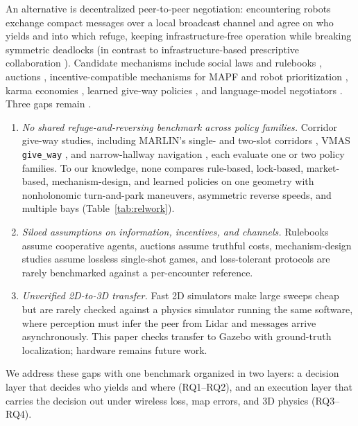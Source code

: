 An alternative is decentralized peer-to-peer negotiation: encountering robots exchange compact messages over a local broadcast channel and agree on who yields and into which refuge, keeping infrastructure-free operation while breaking symmetric deadlocks (in contrast to infrastructure-based prescriptive collaboration \cite{george2025infrastructure}). Candidate mechanisms include social laws and rulebooks \cite{kato1992coordinating,shoham1995social,censi2019rulebooks}, auctions \cite{gerkey2002sold,gautier2022negotiated}, incentive-compatible mechanisms for MAPF and robot prioritization \cite{amir2015mapfauction,das2021omcorp,friedrich2024scalable}, karma economies \cite{censi2019karma,elokda2024karma}, learned give-way policies \cite{bettini2022vmas,bettini2023heterogeneous,park2023hallucination}, and language-model negotiators \cite{marlin2024,gamechat2025,garg2024llm}. Three gaps remain \cite{chandra2026social,francis2025principles}.
\begin{enumerate}
\item \emph{No shared refuge-and-reversing benchmark across policy families.} Corridor give-way studies, including MARLIN's single- and two-slot corridors \cite{marlin2024}, VMAS \texttt{give\_way} \cite{vmasgiveway}, and narrow-hallway navigation \cite{park2023hallucination,alghamdi2025opinion}, each evaluate one or two policy families. To our knowledge, none compares rule-based, lock-based, market-based, mechanism-design, and learned policies on one geometry with nonholonomic turn-and-park maneuvers, asymmetric reverse speeds, and multiple bays (Table~\ref{tab:relwork}).
\item \emph{Siloed assumptions on information, incentives, and channels.} Rulebooks assume cooperative agents, auctions assume truthful costs, mechanism-design studies assume lossless single-shot games, and loss-tolerant protocols are rarely benchmarked against a per-encounter reference.
\item \emph{Unverified 2D-to-3D transfer.} Fast 2D simulators make large sweeps cheap but are rarely checked against a physics simulator running the same software, where perception must infer the peer from Lidar and messages arrive asynchronously. This paper checks transfer to Gazebo with ground-truth localization; hardware remains future work.
\end{enumerate}
We address these gaps with one benchmark organized in two layers: a decision layer that decides who yields and where (RQ1--RQ2), and an execution layer that carries the decision out under wireless loss, map errors, and 3D physics (RQ3--RQ4).
